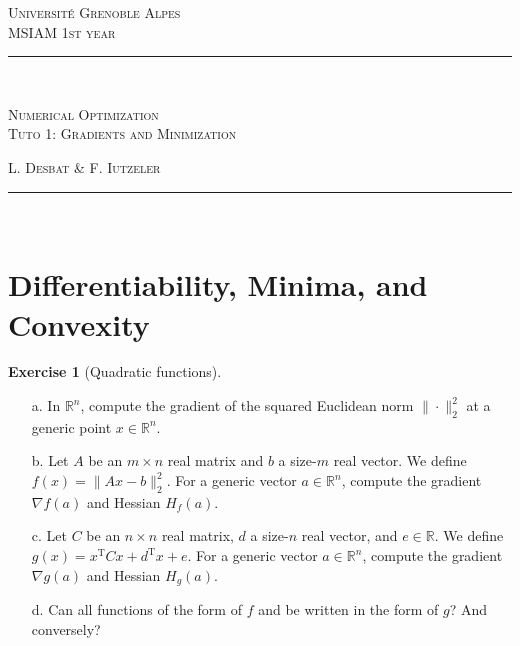 \documentclass[a4paper,twoside,10pt]{amsart}
\numberwithin{equation}{section} %
\numberwithin{figure}{section} %
\numberwithin{table}{section} %
\newcommand{\horrule}[1]{\rule{\linewidth}{#1}} %
\theoremstyle{definition}
\newtheorem{q_td}{Exercise }
\begin{document}


\normalfont \normalsize 
\noindent\textsc{\small Universit\'e Grenoble Alpes  }\\
\noindent\textsc{\small  \hfill MSIAM 1st year} \\ [0.3cm] %
\horrule{0.5pt} \\[0.4cm] %
\begin{center}
{\LARGE \scshape  Numerical Optimization\\ Tuto 1: Gradients and Minimization} \\ %
\end{center}
\noindent\textsc{\hfill L. Desbat \& F. Iutzeler } 
\horrule{2pt} \\[0.5cm] %



\setcounter{section}{0}
\renewcommand{\thesection}{\Alph{section}} 
\renewcommand*{\theHsection}{TD.\the\value{section}}


\vspace*{0.5cm}

\section{Differentiability, Minima, and Convexity}


\begin{q_td}[Quadratic functions]\label{td:qp}\hfill

\begin{itemize}
\item[a.] In $\mathbb{R}^n$, compute the gradient of the squared Euclidean norm $\|\cdot\|_2^2$ at a generic point $x\in\mathbb{R}^n$.
\item[b.] Let $A$ be an $m \times n$ real matrix and $b$ a size-$m$ real vector. We define $f(x) = \|Ax-b\|_2^2$. For a generic vector $a\in \mathbb{R}^n$, compute the gradient $\nabla f(a)$ and Hessian $H_f(a)$.
\item[c.] Let $C$ be an $n \times n$ real matrix, $d$ a size-$n$ real vector, and $e\in\mathbb{R}$. We define $g(x) = x^\mathrm{T}Cx + d^\mathrm{T}x + e$. For a generic vector $a\in \mathbb{R}^n$, compute the gradient $\nabla g(a)$ and Hessian $H_g(a)$.
\item[d.] Can all functions of the form of $f$ and be written in the form of $g$? And conversely? 
\end{itemize}
\end{q_td}
\end{document}
